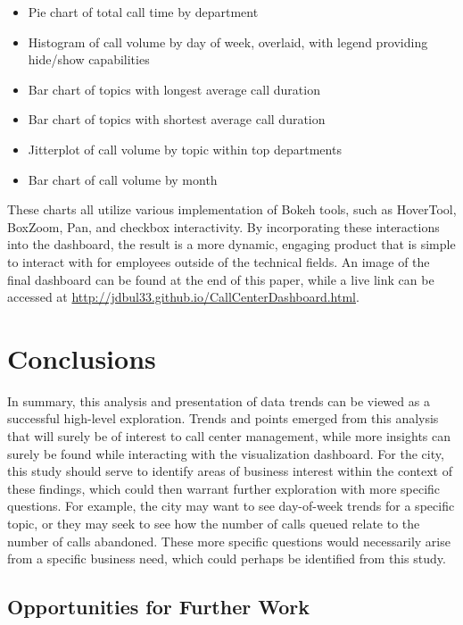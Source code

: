 \documentclass{article}
\begin{document}
\begin{itemize}
  \item{Pie chart of total call time by department}
  \item{Histogram of call volume by day of week, overlaid, with legend providing hide/show capabilities}
  \item{Bar chart of topics with longest average call duration}
  \item{Bar chart of topics with shortest average call duration}
  \item{Jitterplot of call volume by topic within top departments}
  \item{Bar chart of call volume by month}
\end{itemize}

These charts all utilize various implementation of Bokeh tools, such as HoverTool, BoxZoom, Pan, and checkbox interactivity.  By incorporating these interactions into the dashboard, the result is a more dynamic, engaging product that is simple to interact with for employees outside of the technical fields.  An image of the final dashboard can be found at the end of this paper, while a live link can be accessed at \href{http://jdbul33.github.io/CallCenterDashboard.html}{http://jdbul33.github.io/CallCenterDashboard.html}.


\section{Conclusions}

In summary, this analysis and presentation of data trends can be viewed as a successful high-level exploration.  Trends and points emerged from this analysis that will surely be of interest to call center management, while more insights can surely be found while interacting with the visualization dashboard.  For the city, this study should serve to identify areas of business interest within the context of these findings, which could then warrant further exploration with more specific questions.  For example, the city may want to see day-of-week trends for a specific topic, or they may seek to see how the number of calls queued relate to the number of calls abandoned.  These more specific questions would necessarily arise from a specific business need, which could perhaps be identified from this study.

	\subsection{Opportunities for Further Work}
\end{document}
